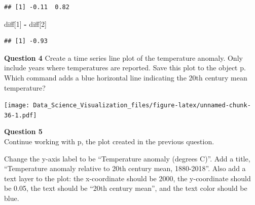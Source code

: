 \documentclass[
]{article}
\newenvironment{Shaded}{\begin{snugshade}}{\end{snugshade}}
\newcommand{\DataTypeTok}[1]{\textcolor[rgb]{0.13,0.29,0.53}{#1}}
\newcommand{\DecValTok}[1]{\textcolor[rgb]{0.00,0.00,0.81}{#1}}
\newcommand{\KeywordTok}[1]{\textcolor[rgb]{0.13,0.29,0.53}{\textbf{#1}}}
\newcommand{\NormalTok}[1]{#1}
\newcommand{\OperatorTok}[1]{\textcolor[rgb]{0.81,0.36,0.00}{\textbf{#1}}}
\newcommand{\StringTok}[1]{\textcolor[rgb]{0.31,0.60,0.02}{#1}}
\begin{document}
\begin{verbatim}
## [1] -0.11  0.82
\end{verbatim}

\begin{Shaded}
\begin{Highlighting}[]
\NormalTok{diff[}\DecValTok{1}\NormalTok{] }\OperatorTok{-}\StringTok{ }\NormalTok{diff[}\DecValTok{2}\NormalTok{]}
\end{Highlighting}
\end{Shaded}

\begin{verbatim}
## [1] -0.93
\end{verbatim}

\textbf{Question 4} Create a time series line plot of the temperature
anomaly. Only include years where temperatures are reported. Save this
plot to the object p.\\
Which command adds a blue horizontal line indicating the 20th century
mean temperature?

\begin{Shaded}
\end{Shaded}

\texttt{[image: Data\_Science\_Visualization\_files/figure-latex/unnamed-chunk-36-1.pdf]}

\textbf{Question 5}\\
Continue working with p, the plot created in the previous question.

Change the y-axis label to be ``Temperature anomaly (degrees C)''. Add a
title, ``Temperature anomaly relative to 20th century mean, 1880-2018''.
Also add a text layer to the plot: the x-coordinate should be 2000, the
y-coordinate should be 0.05, the text should be ``20th century mean'',
and the text color should be blue.
\end{document}
